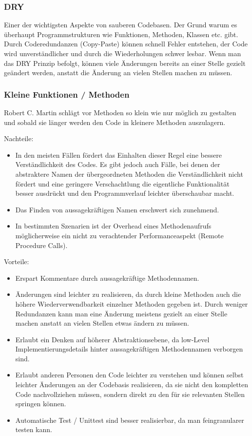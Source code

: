 \subsubsection{DRY}
  
Einer der wichtigsten Aspekte von sauberen Codebasen. Der Grund warum es überhaupt 
Programmstrukturen wie Funktionen, Methoden, Klassen etc. gibt.
Durch Coderedundanzen (Copy-Paste) können schnell Fehler entstehen, der Code
wird unverständlicher und durch die Wiederholungen schwer lesbar.
Wenn man das DRY Prinzip befolgt, können viele Änderungen bereits an
einer Stelle gezielt geändert werden, anstatt die Änderung an vielen Stellen
machen zu müssen.

\subsubsection{Kleine Funktionen / Methoden}

Robert C. Martin schlägt vor Methoden so klein wie nur möglich zu gestalten und sobald 
sie länger werden den Code in kleinere Methoden auszulagern.

\bigskip
Nachteile:
\begin{itemize}
\item In den meisten Fällen fördert das Einhalten dieser Regel eine bessere Verständlichkeit
des Codes. Es gibt jedoch auch Fälle, bei denen der abstraktere Namen der übergeordneten Methoden die Verständlichkeit nicht
fördert und eine geringere Verschachtlung die eigentliche Funktionalität besser
ausdrückt und den Programmverlauf leichter überschaubar macht.
\item Das Finden von aussagekräftigen Namen erschwert sich zunehmend.
\item In bestimmten Szenarien ist der Overhead eines Methodenaufrufs möglicherweise
ein nicht zu verachtender Performanceaspekt (Remote Procedure Calls).
\end{itemize}
\bigskip
Vorteile:
\begin{itemize}
\item Erspart Kommentare durch aussagekräftige Methodennamen.
\item Änderungen sind leichter zu realisieren, da durch kleine Methoden auch die
höhere Wiederverwendbarkeit einzelner Methoden gegeben ist. Durch weniger Redundanzen kann man
eine Änderung meistens gezielt an einer Stelle machen anstatt an vielen
Stellen etwas ändern zu müssen.
\item Erlaubt ein Denken auf höherer Abstraktionsebene, da low-Level
Implementierungsdetails hinter aussagekräftigen Methodennamen verborgen sind.
\item Erlaubt anderen Personen den Code leichter zu verstehen und  können selbst
leichter Änderungen an der Codebasis realisieren, da sie nicht den kompletten
Code nachvollziehen müssen, sondern direkt zu den für sie relevanten Stellen
springen können.
\item Automatische Test / Unittest sind besser realisierbar, da man feingranularer
testen kann.
\end{itemize}


